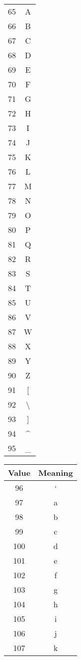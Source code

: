 \documentclass[12pt]{book}
\begin{document}
{\begin{tabular}{c c}
     65 & A \\
     66 & B \\
     67 & C \\
     68 & D \\
     69 & E \\
     70 & F \\
     71 & G \\
     72 & H \\
     73 & I \\
     74 & J \\
     75 & K \\
     76 & L \\
     77 & M \\
     78 & N \\
     79 & O \\
     80 & P \\
     81 & Q \\
     82 & R \\
     83 & S \\
     84 & T \\
     85 & U \\
     86 & V \\
     87 & W \\
     88 & X \\
     89 & Y \\
     90 & Z \\
     91 & [ \\
     92 & \textbackslash \\
     93 & ] \\
     94 & \textasciicircum \\
     95 & \_ \\
  \end{tabular}
  \quad
  \begin{tabular}{c c}
    \hline
    Value & Meaning \\
    \hline
     96 & ` \\
     97 & a \\
     98 & b \\
     99 & c \\
    100 & d \\
    101 & e \\
    102 & f \\
    103 & g \\
    104 & h \\
    105 & i \\
    106 & j \\
    107 & k \\

\end{tabular}}
\end{document}
